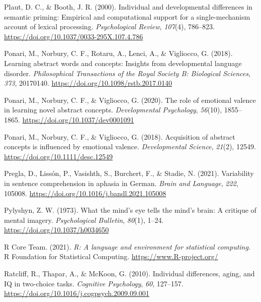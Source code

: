 \documentclass[
  12pt,
  man,floatsintext]{apa7}
\newlength{\cslhangindent}
\newlength{\cslentryspacingunit} %
\newenvironment{CSLReferences}[2] %
 {%
  \setlength{\parindent}{0pt}
  \ifodd #1
  \let\oldpar\par
  \def\par{\hangindent=\cslhangindent\oldpar}
  \fi
  \setlength{\parskip}{#2\cslentryspacingunit}
 }%
 {}
\begin{document}
\begin{CSLReferences}{1}{0}
\leavevmode{}%
Plaut, D. C., \& Booth, J. R. (2000). Individual and developmental differences in semantic priming: {Empirical} and computational support for a single-mechanism account of lexical processing. \emph{Psychological Review}, \emph{107}(4), 786--823. \url{https://doi.org/10.1037/0033-295X.107.4.786}

\leavevmode{}%
Ponari, M., Norbury, C. F., Rotaru, A., Lenci, A., \& Vigliocco, G. (2018). Learning abstract words and concepts: {Insights} from developmental language disorder. \emph{Philosophical Transactions of the Royal Society B: Biological Sciences}, \emph{373}, 20170140. \url{https://doi.org/10.1098/rstb.2017.0140}

\leavevmode{}%
Ponari, M., Norbury, C. F., \& Vigliocco, G. (2020). The role of emotional valence in learning novel abstract concepts. \emph{Developmental Psychology}, \emph{56}(10), 1855--1865. \url{https://doi.org/10.1037/dev0001091}

\leavevmode{}%
Ponari, M., Norbury, C. F., \& Vigliocco, G. (2018). Acquisition of abstract concepts is influenced by emotional valence. \emph{Developmental Science}, \emph{21}(2), 12549. \url{https://doi.org/10.1111/desc.12549}

\leavevmode{}%
Pregla, D., Lissón, P., Vasishth, S., Burchert, F., \& Stadie, N. (2021). Variability in sentence comprehension in aphasia in {German}. \emph{Brain and Language}, \emph{222}, 105008. \url{https://doi.org/10.1016/j.bandl.2021.105008}

\leavevmode{}%
Pylyshyn, Z. W. (1973). What the mind's eye tells the mind's brain: {A} critique of mental imagery. \emph{Psychological Bulletin}, \emph{80}(1), 1--24. \url{https://doi.org/10.1037/h0034650}

\leavevmode{}%
R Core Team. (2021). \emph{R: A language and environment for statistical computing}. R Foundation for Statistical Computing. \url{https://www.R-project.org/}

\leavevmode{}%
Ratcliff, R., Thapar, A., \& McKoon, G. (2010). Individual differences, aging, and {IQ} in two-choice tasks. \emph{Cognitive Psychology}, \emph{60}, 127--157. \url{https://doi.org/10.1016/j.cogpsych.2009.09.001}


\end{CSLReferences}
\end{document}
